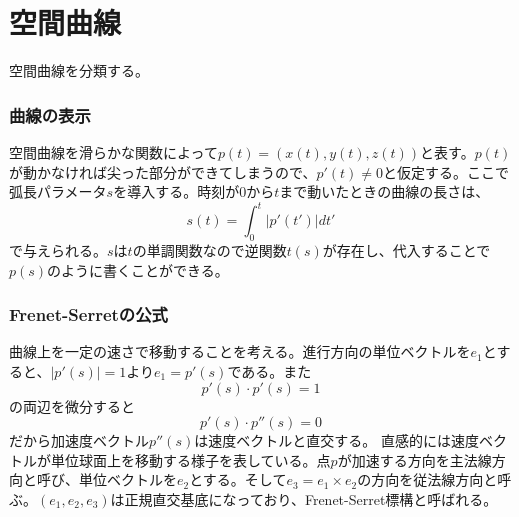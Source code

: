 \part{空間曲線}

空間曲線を分類する。

\section{曲線の表示}
    空間曲線を滑らかな関数によって$p(t) = (x(t), y(t), z(t))$と表す。$p(t)$が動かなければ尖った部分ができてしまうので、$p'(t) \neq 0$と仮定する。ここで弧長パラメータ$s$を導入する。時刻が0から$t$まで動いたときの曲線の長さは、
        \[s(t) = \int_0^t |p'(t')|dt'\]
    で与えられる。$s$は$t$の単調関数なので逆関数$t(s)$が存在し、代入することで$p(s)$のように書くことができる。

\section{Frenet-Serretの公式}
    曲線上を一定の速さで移動することを考える。進行方向の単位ベクトルを$e_1$とすると、$|p'(s)| = 1$より$e_1 = p'(s)$である。また
        \[p'(s) \cdot p'(s) = 1\]
    の両辺を微分すると
        \[p'(s) \cdot p''(s) = 0\]
    だから加速度ベクトル$p''(s)$は速度ベクトルと直交する。
    直感的には速度ベクトルが単位球面上を移動する様子を表している。点$p$が加速する方向を主法線方向と呼び、単位ベクトルを$e_2$とする。そして$e_3 = e_1\times e_2$の方向を従法線方向と呼ぶ。$(e_1, e_2, e_3)$は正規直交基底になっており、Frenet-Serret標構と呼ばれる。

